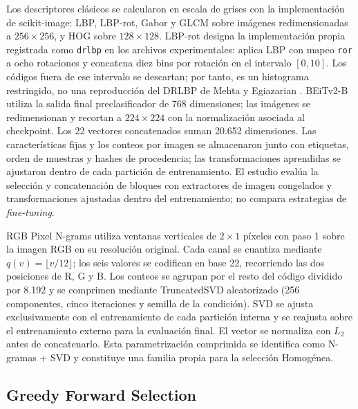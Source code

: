 \documentclass[a4paper,fleqn]{cas-sc}
\begin{document}
Los descriptores clásicos se calcularon en escala de grises con la implementación de scikit-image: LBP, LBP-rot, Gabor y GLCM sobre imágenes redimensionadas a $256\times256$, y HOG sobre $128\times128$. LBP-rot designa la implementación propia registrada como \texttt{drlbp} en los archivos experimentales: aplica LBP con mapeo \texttt{ror} a ocho rotaciones y concatena diez bins por rotación en el intervalo $[0,10]$. Los códigos fuera de ese intervalo se descartan; por tanto, es un histograma restringido, no una reproducción del DRLBP de Mehta y Egiazarian \citep{mehta2016drlbp}. BEiTv2-B utiliza la salida final preclasificador de 768 dimensiones; las imágenes se redimensionan y recortan a $224\times224$ con la normalización asociada al checkpoint. Los 22 vectores concatenados suman 20.652 dimensiones. Las características fijas y los conteos por imagen se almacenaron junto con etiquetas, orden de muestras y hashes de procedencia; las transformaciones aprendidas se ajustaron dentro de cada partición de entrenamiento. El estudio evalúa la selección y concatenación de bloques con extractores de imagen congelados y transformaciones ajustadas dentro del entrenamiento; no compara estrategias de \emph{fine-tuning}.

RGB Pixel N-grams \citep{paiva2023rgb} utiliza ventanas verticales de $2\times1$ píxeles con paso 1 sobre la imagen RGB en su resolución original. Cada canal se cuantiza mediante $q(v)=\lfloor v/12\rfloor$; los seis valores se codifican en base 22, recorriendo las dos posiciones de R, G y B. Los conteos se agrupan por el resto del código dividido por 8.192 y se comprimen mediante TruncatedSVD aleatorizado (256 componentes, cinco iteraciones y semilla de la condición). SVD se ajusta exclusivamente con el entrenamiento de cada partición interna y se reajusta sobre el entrenamiento externo para la evaluación final. El vector se normaliza con $L_2$ antes de concatenarlo. Esta parametrización comprimida se identifica como N-gramas + SVD y constituye una familia propia para la selección Homogénea.

\subsection{Greedy Forward Selection}
\end{document}
